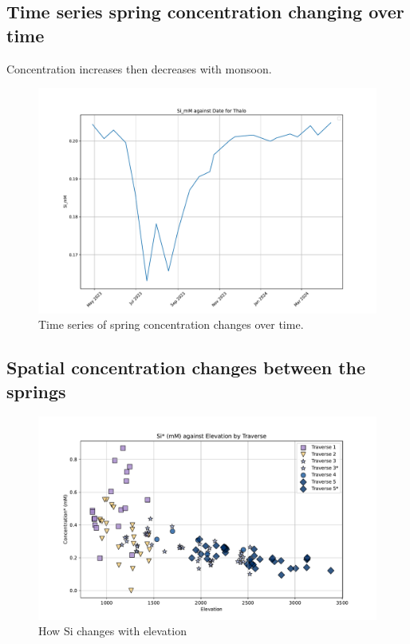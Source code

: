 \FloatBarrier


\subsection{Time series spring concentration changing over time}
Concentration increases then decreases with monsoon.

\begin{figure}[h]
    \centering
    \includegraphics[width=\textwidth]{Si_mM_Thalo_timeseries.pdf}
    \caption{Time series of spring concentration changes over time.}
    \label{fig:time_series_changes}
\end{figure}

\FloatBarrier

\subsection{Spatial concentration changes between the springs}

\begin{figure}[h]
    \centering
    \includegraphics[width=\textwidth]{Si_mM_EC_Elevation.pdf}
    \caption{How Si changes with elevation}
    \label{fig:spatial_changes_spring1}
\end{figure}

